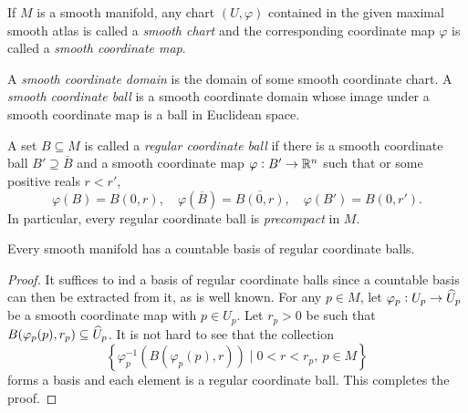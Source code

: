 \begin{definition}
    If $M$ is a smooth manifold, any chart $(U,\varphi)$ contained in the given maximal smooth atlas is called a \emph{smooth chart} and the corresponding coordinate map $\varphi$ is called a \emph{smooth coordinate map}. 
    
    A \emph{smooth coordinate domain} is the domain of some smooth coordinate chart. A \emph{smooth coordinate ball} is a smooth coordinate domain whose image under a smooth coordinate map is a ball in Euclidean space.

    A set $B\subseteq M$ is called a \emph{regular coordinate ball} if there is a smooth coordinate ball $B'\supseteq\overline B$ and a smooth coordinate map $\varphi: B'\to\mathbb{R}^n$ such that or some positive reals $r < r'$, 
    \begin{equation*}
        \varphi(B) = B(0,r),\quad\varphi(\overline B) = \overline{B(0,r)},\quad\varphi(B') = B(0, r').
    \end{equation*}
    In particular, every regular coordinate ball is \emph{precompact} in $M$.
\end{definition}

\begin{proposition}
    Every smooth manifold has a countable basis of regular coordinate balls.
\end{proposition}
\begin{proof}
    It suffices to ind a basis of regular coordinate balls since a countable basis can then be extracted from it, as is well known. For any $p\in M$, let $\varphi_p: U_p\to\widehat{U}_p$ be a smooth coordinate map with $p\in U_p$. Let $r_p > 0$ be such that $B(\varphi_p(p), r_p)\subseteq\widehat{U}_p$. It is not hard to see that the collection 
    \begin{equation*}
        \left\{\varphi_p^{-1}(B(\varphi_p(p), r))\mid 0 < r < r_p,~p\in M\right\}
    \end{equation*}
    forms a basis and each element is a regular coordinate ball. This completes the proof.
\end{proof}

